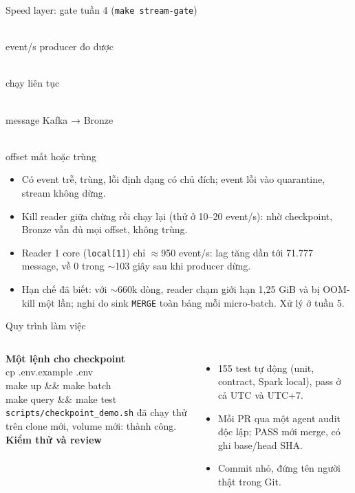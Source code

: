 \documentclass[aspectratio=169,11pt]{beamer}
\newcommand{\GATERATE}{1000}
\newcommand{\GATEMSGS}{600k}
\newcommand{\GATELAG}{71.777}
\newcommand{\GATECATCHUP}{103}
\newcommand{\GATETESTS}{155}
\newcommand{\cmd}[1]{{\ttfamily\small\color{teal}#1}}
\newcommand{\bignum}[2]{\begin{minipage}[t]{0.23\textwidth}\centering{\Huge\bfseries\color{teal}#1}\\[2pt]{\small\color{muted}#2}\end{minipage}}
\begin{document}
\begin{frame}{Speed layer: gate tuần 4 (\texttt{make stream-gate})}
  \begin{center}
    \bignum{\GATERATE}{event/s producer đo được}\hfill
    \bignum{10 phút}{chạy liên tục}\hfill
    \bignum{\GATEMSGS}{message Kafka → Bronze}\hfill
    \bignum{0}{offset mất hoặc trùng}
  \end{center}
  \vfill
  \small
  \begin{itemize}
    \item Có event trễ, trùng, lỗi định dạng có chủ đích; event lỗi vào quarantine, stream không dừng.
    \item Kill reader giữa chừng rồi chạy lại (thử ở 10–20 event/s): nhờ checkpoint, Bronze vẫn đủ mọi offset, không trùng.
    \item Reader 1 core (\texttt{local[1]}) chỉ $\approx$950 event/s: lag tăng dần tới \GATELAG{} message, về 0 trong $\sim$\GATECATCHUP{} giây sau khi producer dừng.
    \item \alert{Hạn chế đã biết:} với $\sim$660k dòng, reader chạm giới hạn 1,25 GiB và bị OOM-kill một lần; nghi do sink \texttt{MERGE} toàn bảng mỗi micro-batch. Xử lý ở tuần 5.
  \end{itemize}
\end{frame}

\begin{frame}{Quy trình làm việc}
  \begin{columns}[T,onlytextwidth]
      \textbf{Một lệnh cho checkpoint}\\
      \cmd{cp .env.example .env}\\
      \cmd{make up \&\& make batch}\\
      \cmd{make query \&\& make test}\\[4pt]
      {\small \texttt{scripts/checkpoint\_demo.sh} đã chạy thử trên clone mới, volume mới: thành công.}
      \textbf{Kiểm thử và review}\\
      {\small
      \begin{itemize}
        \item \GATETESTS{} test tự động (unit, contract, Spark local), pass ở cả UTC và UTC+7.
        \item Mỗi PR qua một agent audit độc lập; PASS mới merge, có ghi base/head SHA.
        \item Commit nhỏ, đứng tên người thật trong Git.
      \end{itemize}}
  \end{columns}
\end{frame}
\end{document}
